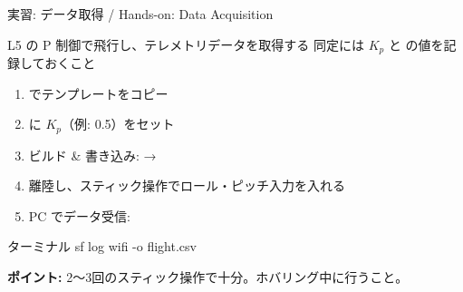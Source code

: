 \begin{frame}[fragile]{実習: データ取得 / Hands-on: Data Acquisition}
  \begin{block}{L5 の P 制御で飛行し、テレメトリデータを取得する}
    {\footnotesize 同定には $K_p$ と  の値を記録しておくこと}
  \end{block}

  \vspace{0.5em}

  \begin{enumerate}
    \item {} でテンプレートをコピー
    \item {} に $K_p$（例: 0.5）をセット
    \item ビルド \& 書き込み:  → 
    \item 離陸し、スティック操作でロール・ピッチ入力を入れる
    \item PC でデータ受信:
  \end{enumerate}

  \begin{sflisting}{ターミナル}
sf log wifi -o flight.csv
  \end{sflisting}

  \vspace{0.5em}

  {\small \textbf{ポイント:} 2〜3回のスティック操作で十分。ホバリング中に行うこと。}
\end{frame}

